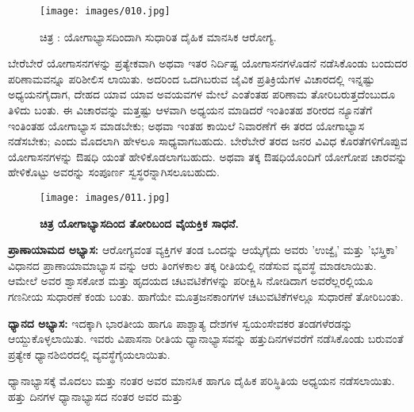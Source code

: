\begin{center}
\end{center}


\begin{figure}
\texttt{[image: images/010.jpg]}
\caption{ಚಿತ್ರ : ಯೋಗಾಭ್ಯಾಸದಿಂದಾಗಿ ಸುಧಾರಿತ ದೈಹಿಕ ಮಾನಸಿಕ ಆರೋಗ್ಯ.}
\end{figure}

ಬೇರೆಬೇರೆ ಯೋಗಾಸನಗಳನ್ನು ಪ್ರತ್ಯೇಕವಾಗಿ ಅಥವಾ ಇತರ ನಿರ್ದಿಷ್ಟ ಯೋಗಾಸನಗಳೊಡನೆ ನಡೆಸಿಕೊಂಡು ಬಂದುದರ ಪರಿಣಾಮವನ್ನೂ ಪರಿಶೀಲಿಸ ಲಾಯಿತು. ಅದರಿಂದ ಒದಗಿಬರುವ ಜೈವಿಕ ಪ್ರತಿಕ್ರಿಯೆಗಳ ವಿಚಾರದಲ್ಲಿ ಇನ್ನಷ್ಟು ಅಧ್ಯಯನಗೈದಾಗ, ದೇಹದ ಯಾವ ಯಾವ ಅವಯವಗಳ ಮೇಲೆ ಎಂತೆಂತಹ ಪರಿಣಾಮ ತೋರಿಬರುತ್ತದೆಂಬುದೂ ತಿಳಿದು ಬಂತು. ಈ ವಿಚಾರವನ್ನು ಮತ್ತಷ್ಟು ಆಳವಾಗಿ ಅಧ್ಯಯನ ಮಾಡಿದರೆ ಇಂತಿಂತಹ ಶರೀರದ ನ್ಯೂನತೆಗೆ ಇಂತಿಂತಹ ಯೋಗಾಭ್ಯಾಸ ಮಾಡಬೇಕು; ಅಥವಾ ಇಂತಹ ಕಾಯಿಲೆ ನಿವಾರಣೆಗೆ ಈ ತರದ ಯೋಗಾಭ್ಯಾಸ ನಡೆಸಬೇಕು; ಎಂದು ಮೊದಲಾಗಿ ಹೇಳಲೂ ಸಾಧ್ಯವಾಗಬಹುದು. ಬೇರೆಬೇರೆ ತರದ ಜನರ ವಿವಿಧ ಕೊರತೆಗಳಿಗೊಪ್ಪುವ ಯೋಗಾಸನಗಳನ್ನು ಔಷಧಿ ಯಂತೆ ಹೇಳಿಕೊಡಲಾಗಬಹುದು. ಅಥವಾ ತಕ್ಕ ಔಷಧಿಯೊಂದಿಗೆ ಯೋಗೋಪ ಚಾರವನ್ನು ಹೇಳಿಕೊಟ್ಟು ಅವರನ್ನು ಸಂಪೂರ್ಣ ಸ್ವಸ್ಥರನ್ನಾಗಿಸಲೂಬಹುದು.

\begin{figure}
\texttt{[image: images/011.jpg]}
\caption{ \textbf{ಚಿತ್ರ  ಯೋಗಾಭ್ಯಾಸದಿಂದ ತೋರಿಬಂದ ವೈಯಕ್ತಿಕ ಸಾಧನೆ.} }
\end{figure}

\textbf{ಪ್ರಾಣಾಯಾಮದ ಅಭ್ಯಾಸ:} ಆರೋಗ್ಯವಂತ ವ್ಯಕ್ತಿಗಳ ತಂಡ ಒಂದನ್ನು ಆಯ್ಕೆಗೈದು ಅವರು 'ಉಜ್ವೈ' ಮತ್ತು 'ಭಸ್ತ್ರಿಕಾ' ವಿಧಾನದ ಪ್ರಾಣಾಯಾಮಾಭ್ಯಾಸ ವನ್ನು ಆರು ತಿಂಗಳಕಾಲ ತಕ್ಕ ರೀತಿಯಲ್ಲಿ ನಡೆಸುವ ವ್ಯವಸ್ಥೆ ಮಾಡಲಾಯಿತು. ಆಮೇಲೆ ಅವರ ಶ್ವಾಸಕೋಶ ಮತ್ತು ಹೃದಯದ ಚಟವಟಿಕೆಗಳನ್ನು ಪರೀಕ್ಷಿಸಿ ನೋಡಿದಾಗ ಅವರೆಲ್ಲರಲ್ಲಿಯೂ ಗಣನೀಯ ಸುಧಾರಣೆ ಕಂಡು ಬಂತು. ಹಾಗೆಯೇ ಮೂತ್ರಜನಕಾಂಗಗಳ  ಚಟುವಟಿಕೆಗಳಲ್ಲೂ ಸುಧಾರಣೆ ತೋರಿಬಂತು.

\textbf{ಧ್ಯಾನದ ಅಭ್ಯಾಸ:} ಇದಕ್ಕಾಗಿ ಭಾರತೀಯ ಹಾಗೂ ಪಾಶ್ಚಾತ್ಯ ದೇಶಗಳ ಸ್ವಯಂಸೇವಕರ ತಂಡಗಳೆರಡನ್ನು ಆಯ್ದುಕೊಳ್ಳಲಾಯಿತು. ಇವರು ವಿಪಾಸನಾ ರೀತಿಯ ಧ್ಯಾನಾಭ್ಯಾಸವನ್ನು ಹತ್ತುದಿನಗಳವರೆಗೆ ನಡೆಸಿಕೊಂಡು ಬರುವಂತೆ ಪ್ರತ್ಯೇಕ ಧ್ಯಾನಶಿಬಿರದಲ್ಲಿ ವ್ಯವಸ್ಥೆಗೈಯಲಾಯಿತು.

ಧ್ಯಾನಾಭ್ಯಾಸಕ್ಕೆ ಮೊದಲು ಮತ್ತು ನಂತರ ಅವರ ಮಾನಸಿಕ ಹಾಗೂ ದೈಹಿಕ ಪರಿಸ್ಥಿತಿಯ ಅಧ್ಯಯನ ನಡೆಸಲಾಯಿತು. ಹತ್ತು ದಿನಗಳ ಧ್ಯಾನಾಭ್ಯಾಸದ ನಂತರ ಅವರ  ಮತ್ತು 

